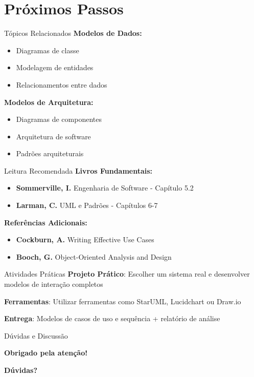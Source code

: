 \documentclass[aspectratio=169]{beamer}
\begin{document}
\section{Próximos Passos}

\begin{frame}{Tópicos Relacionados}
\textbf{Modelos de Dados:}
\begin{itemize}
\item Diagramas de classe
\item Modelagem de entidades
\item Relacionamentos entre dados
\end{itemize}

\vspace{0.5cm}
\textbf{Modelos de Arquitetura:}
\begin{itemize}
\item Diagramas de componentes
\item Arquitetura de software
\item Padrões arquiteturais
\end{itemize}
\end{frame}

\begin{frame}{Leitura Recomendada}
\textbf{Livros Fundamentais:}
\begin{itemize}
\item \textbf{Sommerville, I.} Engenharia de Software - Capítulo 5.2
\item \textbf{Larman, C.} UML e Padrões - Capítulos 6-7
\end{itemize}

\vspace{0.5cm}
\textbf{Referências Adicionais:}
\begin{itemize}
\item \textbf{Cockburn, A.} Writing Effective Use Cases
\item \textbf{Booch, G.} Object-Oriented Analysis and Design
\end{itemize}
\end{frame}

\begin{frame}{Atividades Práticas}
\textbf{Projeto Prático}: Escolher um sistema real e desenvolver modelos de interação completos

\vspace{0.5cm}
\textbf{Ferramentas}: Utilizar ferramentas como StarUML, Lucidchart ou Draw.io

\vspace{0.5cm}
\textbf{Entrega}: Modelos de casos de uso e sequência + relatório de análise
\end{frame}

\begin{frame}{Dúvidas e Discussão}
\begin{center}
\textbf{Obrigado pela atenção!}

\vspace{1cm}
\textbf{Dúvidas?}
\end{center}
\end{frame}
\end{document}
